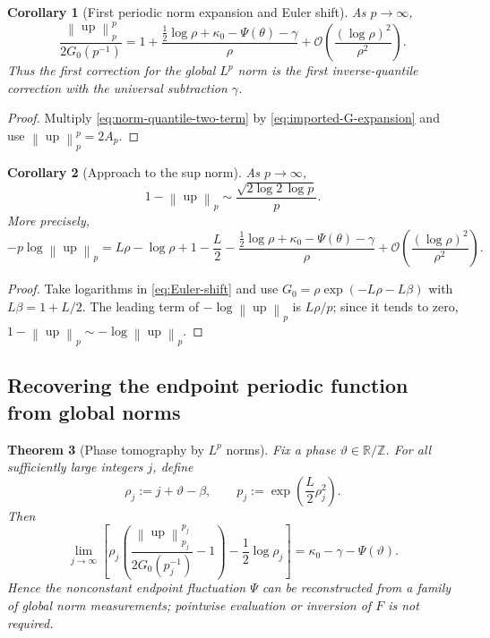 \documentclass[11pt,oneside]{article}
\numberwithin{equation}{section}
\theoremstyle{plain}
\newtheorem{theorem}{Theorem}[section]
\newtheorem{corollary}[theorem]{Corollary}
\theoremstyle{definition}
\theoremstyle{remark}
\newcommand{\R}{\mathbb R}
\newcommand{\Z}{\mathbb Z}
\newcommand{\Up}{\operatorname{up}}
\newcommand{\bigO}{\mathcal O}
\newcommand{\norm}[1]{\left\lVert#1\right\rVert}
\begin{document}
\begin{corollary}[First periodic norm expansion and Euler shift]
\label{cor:Euler-shift}
As $p\to\infty$,
\begin{equation}
 \boxed{
 \frac{\norm{\Up}_p^p}{2G_0(p^{-1})}
 =1+\frac{\frac12\log\rho+\kappa_0-\Psi(\theta)-\gamma}{\rho}
 +\bigO\!\left(\frac{(\log\rho)^2}{\rho^2}\right).}
 \label{eq:Euler-shift}
\end{equation}
Thus the first correction for the global $L^p$ norm is the first inverse-quantile correction
with the universal subtraction $\gamma$.
\end{corollary}

\begin{proof}
Multiply \eqref{eq:norm-quantile-two-term} by
\eqref{eq:imported-G-expansion} and use $\norm{\Up}_p^p=2A_p$.
\end{proof}

\begin{corollary}[Approach to the sup norm]
\label{cor:norm-deficit}
As $p\to\infty$,
\begin{equation}
 \boxed{
 1-\norm{\Up}_p
 \sim\frac{\sqrt{2\log2\,\log p}}{p}.}
 \label{eq:norm-deficit}
\end{equation}
More precisely,
\begin{equation}
 -p\log\norm{\Up}_p
 =L\rho-\log\rho+1-\frac L2
 -\frac{\frac12\log\rho+\kappa_0-\Psi(\theta)-\gamma}{\rho}
 +\bigO\!\left(\frac{(\log\rho)^2}{\rho^2}\right).
 \label{eq:log-norm-refined}
\end{equation}
\end{corollary}

\begin{proof}
Take logarithms in \eqref{eq:Euler-shift} and use
$G_0=\rho\exp(-L\rho-L\beta)$ with $L\beta=1+L/2$.  The leading term of
$-\log\norm{\Up}_p$ is $L\rho/p$; since it tends to zero,
$1-\norm{\Up}_p\sim-\log\norm{\Up}_p$.
\end{proof}

\subsection{Recovering the endpoint periodic function from global norms}

\begin{theorem}[Phase tomography by $L^p$ norms]
\label{thm:phase-tomography}
Fix a phase $\vartheta\in\R/\Z$.  For all sufficiently large integers $j$, define
\begin{equation}
 \rho_j:=j+\vartheta-\beta,
 \qquad
 p_j:=\exp\!\left(\frac L2\rho_j^2\right).
 \label{eq:phase-locked-p}
\end{equation}
Then
\begin{equation}
 \boxed{
 \lim_{j\to\infty}
 \left[
 \rho_j\left(
 \frac{\norm{\Up}_{p_j}^{p_j}}{2G_0(p_j^{-1})}-1
 \right)-\frac12\log\rho_j
 \right]
 =\kappa_0-\gamma-\Psi(\vartheta).}
 \label{eq:phase-tomography-limit}
\end{equation}
Hence the nonconstant endpoint fluctuation $\Psi$ can be reconstructed from a family of
\emph{global norm measurements}; pointwise evaluation or inversion of $F$ is not required.
\end{theorem}
\end{document}
